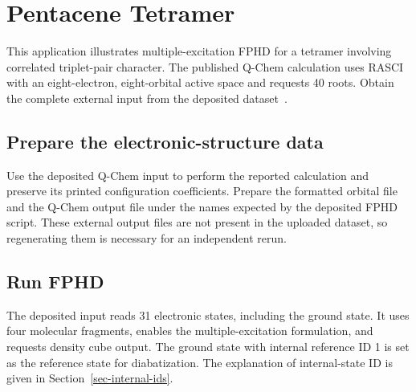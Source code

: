\section{Pentacene Tetramer}\label{sec-tut-pentacene}
This application illustrates multiple-excitation FPHD for a tetramer involving correlated triplet-pair character. The published Q-Chem calculation uses RASCI with an eight-electron, eight-orbital active space and requests 40 roots. Obtain the complete external input from the deposited dataset~\cite{DiabatPaperData2026}.

\subsection{Prepare the electronic-structure data}
Use the deposited Q-Chem input to perform the reported calculation and preserve its printed configuration coefficients. Prepare the formatted orbital file and the Q-Chem output file under the names expected by the deposited FPHD script. These external output files are not present in the uploaded dataset, so regenerating them is necessary for an independent rerun.

\subsection{Run FPHD}
The deposited input reads 31 electronic states, including the ground state. It uses four molecular fragments, enables the multiple-excitation formulation, and requests density cube output. The ground state with internal reference ID 1 is set as the reference state for diabatization. The explanation of internal-state ID is given in Section~\ref{sec-internal-ids}.


